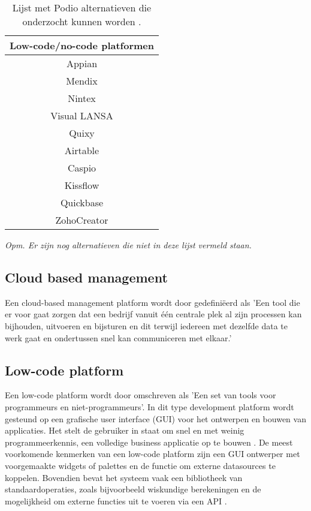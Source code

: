 \begin{table}[ht]
    \centering
    \caption{\label{tab:Tabel 1} Lijst met Podio alternatieven die onderzocht kunnen worden \autocite{Tasmia2022}.}
    \begin{tabular}{ | c | }
        \hline
        \textbf{Low-code/no-code platformen} \\
        \hline
        Appian \\
        Mendix \\
        Nintex \\
        Visual LANSA \\
        Quixy \\
        Airtable \\
        Caspio \\
        Kissflow \\
        Quickbase \\
        ZohoCreator \\
        \hline
    \end{tabular}

    {\raggedright \textit{Opm. Er zijn nog alternatieven die niet in deze lijst vermeld staan.} \par}
\end{table}
 
\subsection{Cloud based management}

Een cloud-based management platform wordt door \textcite{Spitaels2022} gedefiniëerd als 'Een tool die er voor gaat zorgen dat een bedrijf vanuit één centrale plek al zijn processen kan bijhouden, uitvoeren en bijsturen en dit terwijl iedereen met dezelfde data te werk gaat en ondertussen snel kan communiceren met elkaar.' 

\subsection{Low-code platform}

Een low-code platform wordt door \textcite{Waszkowski2019} omschreven als 'Een set van tools voor programmeurs en niet-programmeurs'. In dit type development platform wordt gesteund op een grafische user interface (GUI) voor het ontwerpen en bouwen van applicaties. Het stelt de gebruiker in staat om snel en met weinig programmeerkennis, een volledige business applicatie op te bouwen \autocite{Waszkowski2019}. De meest voorkomende kenmerken van een low-code platform zijn een GUI ontwerper met voorgemaakte widgets of palettes en de functie om externe datasources te koppelen. Bovendien bevat het systeem vaak een bibliotheek van standaardoperaties, zoals bijvoorbeeld wiskundige berekeningen en de mogelijkheid om externe functies uit te voeren via een API \autocite{Bock2021}.

